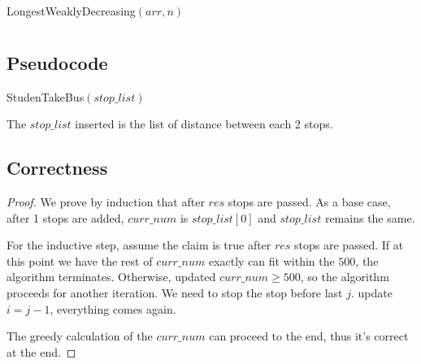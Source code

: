 \documentclass[a4paper]{article}
\begin{document}
\begin{algorithm}
  \caption{LongestWeaklyDecreasing$(arr,n)$}\label{alg:cap3}
  \begin{algorithmic}[1]
    \EndIf
    \EndFor
    \EndFor
  \end{algorithmic}
\end{algorithm}
\section{}
\subsection{Pseudocode}
\begin{algorithm}
  \caption{StudenTakeBus$(stop\_list)$}
  \begin{algorithmic}[1]
      \Break
    \EndIf
    \EndFor
  \EndFor
  \EndFor
  \end{algorithmic}
\end{algorithm}
The $stop\_list$ inserted is the list of distance between each 2 stops.

\subsection{Correctness}
\begin{proof}
We prove by induction that after $res$ stops are passed. As a base case, after 1 stops are added, $curr\_num$ is $stop\_list[0]$ and $stop\_list$ remains the same.

For the inductive step, assume the claim is true after $res$ stops are passed. If at this point we have the rest of $curr\_num$ exactly can fit within the $500$, the algorithm terminates. Otherwise, updated $curr\_num \geq 500$, so the algorithm proceeds for another iteration. We need to stop the stop before last $j$. update $i=j-1$, everything comes again.

The greedy calculation of the $curr\_num$ can proceed to the end, thus it's correct at the end.
\end{proof}
\end{document}
